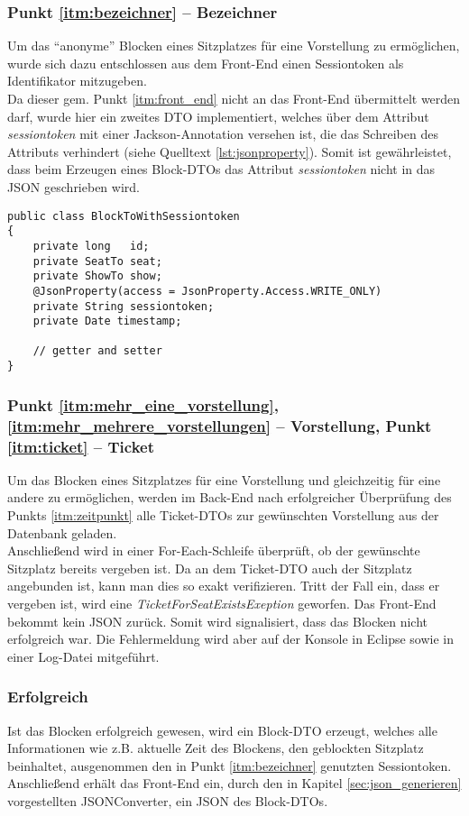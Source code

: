 \subsubsection*{Punkt \ref{itm:bezeichner} -- Bezeichner}
\label{ssssec:Bezeichner}
Um das \enquote{anonyme} Blocken eines Sitzplatzes für eine Vorstellung zu ermöglichen, wurde sich dazu entschlossen aus dem Front-End einen Sessiontoken als Identifikator mitzugeben. \\
Da dieser gem. Punkt \ref{itm:front_end} nicht an das Front-End übermittelt werden darf, wurde hier ein zweites \acs{DTO} implementiert, welches über dem Attribut \textit{sessiontoken} mit einer Jackson-Annotation 
versehen ist, die das Schreiben des Attributs verhindert (siehe Quelltext \vref{lst:jsonproperty}). Somit ist gewährleistet, dass beim Erzeugen eines Block-\acp{DTO} das Attribut \textit{sessiontoken} nicht in das \acs{JSON} geschrieben wird.

\begin{lstlisting}[style=lstJava]
public class BlockToWithSessiontoken
{
	private long   id;
	private SeatTo seat;
	private ShowTo show;
	@JsonProperty(access = JsonProperty.Access.WRITE_ONLY)
	private String sessiontoken;
	private Date timestamp;
		
	// getter and setter
}
\end{lstlisting}
\label{lst:jsonproperty}

\subsubsection*{Punkt \ref{itm:mehr_eine_vorstellung}, \ref{itm:mehr_mehrere_vorstellungen} -- Vorstellung, Punkt \ref{itm:ticket} -- Ticket}
\label{ssssec:Vorstellung}
Um das Blocken eines Sitzplatzes für eine Vorstellung und gleichzeitig für eine andere zu ermöglichen, werden im Back-End nach erfolgreicher Überprüfung des Punkts \ref{itm:zeitpunkt} alle Ticket-\acp{DTO} zur gewünschten Vorstellung aus der Datenbank geladen. \\
Anschließend wird in einer For-Each-Schleife überprüft, ob der gewünschte Sitzplatz bereits vergeben ist. Da an dem Ticket-\acs{DTO} auch der Sitzplatz angebunden ist, kann man dies so exakt verifizieren. Tritt der Fall ein, dass er vergeben ist, wird eine \textit{TicketForSeatExistsExeption} geworfen. Das Front-End bekommt kein \acs{JSON} zurück. Somit wird signalisiert, dass das Blocken nicht erfolgreich war. Die Fehlermeldung wird aber auf der Konsole in Eclipse sowie in einer Log-Datei mitgeführt. 

\subsubsection*{Erfolgreich}
Ist das Blocken erfolgreich gewesen, wird ein Block-\acs{DTO} erzeugt, welches alle Informationen wie z.B. aktuelle Zeit des Blockens, den geblockten Sitzplatz beinhaltet, ausgenommen den in Punkt \ref{itm:bezeichner} genutzten Sessiontoken. Anschließend erhält das Front-End ein, durch den in Kapitel \vref{sec:json_generieren} vorgestellten JSONConverter, ein \acs{JSON} des Block-\acp{DTO}. 